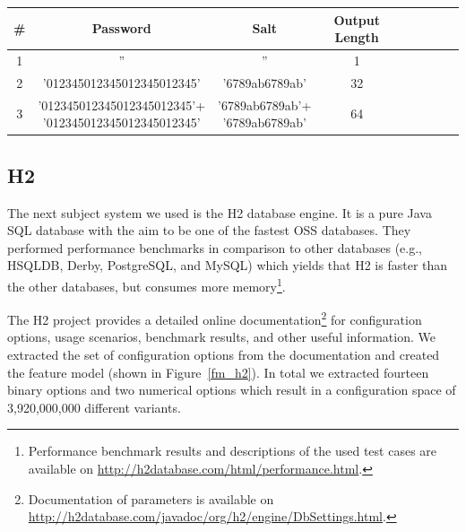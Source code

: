 \begin{table}

	\centering %
    \begin{tabular}{*{9}{c}}
    	\toprule
        \# &Password & Salt & Output Length \\
        \midrule
        1 & '' & '' & 1 \\
        \midrule
        2 & '012345012345012345012345' & '6789ab6789ab' & 32 \\
        \midrule
        3 & \makecell{'012345012345012345012345'+ \\ '012345012345012345012345'} & \makecell{'6789ab6789ab'+ \\ '6789ab6789ab'} & 64 \\
        \bottomrule
    \end{tabular}
    \label{wl_catena}
\end{table}


\subsection{H2}

The next subject system we used is the H2 database engine. It is a pure Java SQL database with the aim to be one of the fastest \ac{OSS} databases. They performed performance benchmarks in comparison to other databases (e.g., HSQLDB, Derby, PostgreSQL, and MySQL) which yields that H2 is faster than the other databases, but consumes more memory\footnote{Performance benchmark results and descriptions of the used test cases are available on \url{http://h2database.com/html/performance.html}.}.

The H2 project provides a detailed online documentation\footnote{Documentation of parameters is available on \url{http://h2database.com/javadoc/org/h2/engine/DbSettings.html}.} for configuration options, usage scenarios, benchmark results, and other useful information. We extracted the set of configuration options from the documentation and created the feature model (shown in Figure~\ref{fm_h2}). In total we extracted fourteen binary options and two numerical options which result in a configuration space of 3,920,000,000 different variants. 


